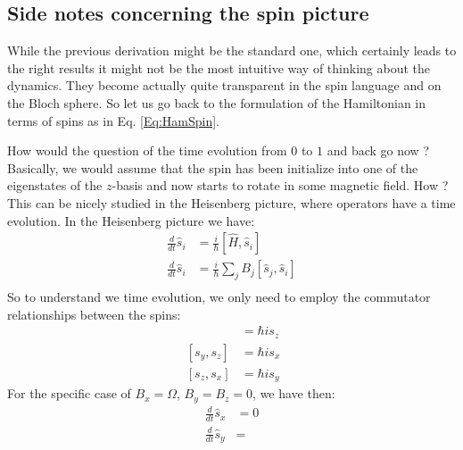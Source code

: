 \subsection{Side notes concerning the spin picture}

While the previous derivation might be the standard one, which certainly leads to the right results it might not be the most intuitive way of thinking about the dynamics. They become actually quite transparent in the spin language and on the Bloch sphere. So let us go back to the formulation of the Hamiltonian in terms of spins as in Eq. \eqref{Eq:HamSpin}.

How would the question of the time evolution from $0$ to $1$ and back go now ? Basically, we would assume that the spin has been initialize into one of the eigenstates of the $z$-basis and now starts to rotate in some magnetic field. How ? This can be nicely studied in the Heisenberg picture, where operators have a time evolution. In the Heisenberg picture we have:
\begin{align}
\frac{d}{dt} \hat{s}_i &= \frac{i}{\hbar}\left[\hat{H},\hat{s}_i\right]\\
\frac{d}{dt} \hat{s}_i &= \frac{i}{\hbar}\sum_j B_j \left[\hat{s}_j,\hat{s}_i\right]\\
 \end{align}
So to understand we time evolution, we only need to employ the commutator relationships between the spins:
\begin{align}
[ s_x, s_y] &= \hbar is_z\\
~[ s_y, s_z] &= \hbar is_x\\
~[ s_z, s_x] &= \hbar is_y
\end{align}
For the specific case of $B_x=\Omega$, $B_y = B_z = 0$, we have then:
\begin{align}
\frac{d}{dt} \hat{s}_x &= 0\\
\frac{d}{dt} \hat{s}_y &= \\
 \end{align}